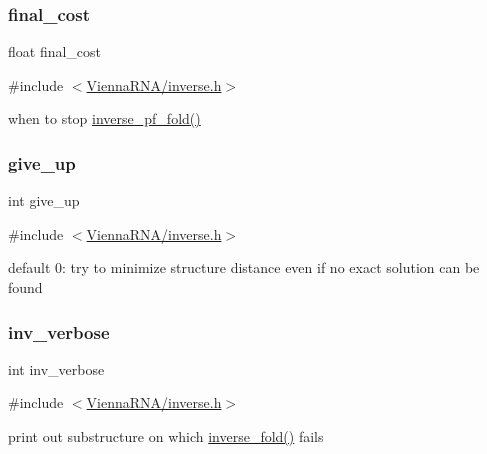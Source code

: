 \subsubsection{\texorpdfstring{final\+\_\+cost}{final\_cost}}
{\footnotesize\ttfamily float final\+\_\+cost}



{\ttfamily \#include $<$\mbox{\hyperlink{inverse_8h}{Vienna\+R\+N\+A/inverse.\+h}}$>$}

when to stop \mbox{\hyperlink{group__inverse__fold_gaeef52ecbf2a2450ad585a344f9826806}{inverse\+\_\+pf\+\_\+fold()}} \mbox{\label{group__inverse__fold_ga7ec4ba51f86e1717a1e174264e4a75ce}} 
\subsubsection{\texorpdfstring{give\+\_\+up}{give\_up}}
{\footnotesize\ttfamily int give\+\_\+up}



{\ttfamily \#include $<$\mbox{\hyperlink{inverse_8h}{Vienna\+R\+N\+A/inverse.\+h}}$>$}

default 0\+: try to minimize structure distance even if no exact solution can be found \mbox{\label{group__inverse__fold_gafcfc65fba01b9cca5946726ed9057a63}} 
\subsubsection{\texorpdfstring{inv\+\_\+verbose}{inv\_verbose}}
{\footnotesize\ttfamily int inv\+\_\+verbose}



{\ttfamily \#include $<$\mbox{\hyperlink{inverse_8h}{Vienna\+R\+N\+A/inverse.\+h}}$>$}

print out substructure on which \mbox{\hyperlink{group__inverse__fold_ga7af026de55d4babad879f2c92559cbbc}{inverse\+\_\+fold()}} fails 